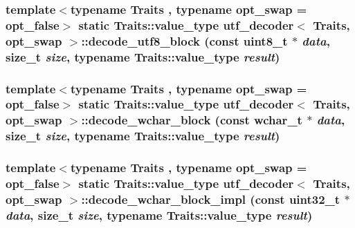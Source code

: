 \label{structutf__decoder_a8bed41cc707328e8d8ab91fd7c3c943e}
\hypertarget{structutf__decoder_a671829bbdba1eac5c8bd2bf781eae498}{
\subsubsection[{decode\_\-utf8\_\-block}]{\setlength{\rightskip}{0pt plus 5cm}template$<$typename Traits , typename opt\_\-swap  = opt\_\-false$>$ static Traits::value\_\-type {\bf utf\_\-decoder}$<$ Traits, opt\_\-swap $>$::decode\_\-utf8\_\-block (const uint8\_\-t $\ast$ {\em data}, \/  size\_\-t {\em size}, \/  typename Traits::value\_\-type {\em result})}}
\label{structutf__decoder_a671829bbdba1eac5c8bd2bf781eae498}
\hypertarget{structutf__decoder_a5953fd0661c64408e08161342e4c538d}{
\subsubsection[{decode\_\-wchar\_\-block}]{\setlength{\rightskip}{0pt plus 5cm}template$<$typename Traits , typename opt\_\-swap  = opt\_\-false$>$ static Traits::value\_\-type {\bf utf\_\-decoder}$<$ Traits, opt\_\-swap $>$::decode\_\-wchar\_\-block (const wchar\_\-t $\ast$ {\em data}, \/  size\_\-t {\em size}, \/  typename Traits::value\_\-type {\em result})}}
\label{structutf__decoder_a5953fd0661c64408e08161342e4c538d}
\hypertarget{structutf__decoder_a3bd423d3ce99b245c76be8a0796d951b}{
\subsubsection[{decode\_\-wchar\_\-block\_\-impl}]{\setlength{\rightskip}{0pt plus 5cm}template$<$typename Traits , typename opt\_\-swap  = opt\_\-false$>$ static Traits::value\_\-type {\bf utf\_\-decoder}$<$ Traits, opt\_\-swap $>$::decode\_\-wchar\_\-block\_\-impl (const uint32\_\-t $\ast$ {\em data}, \/  size\_\-t {\em size}, \/  typename Traits::value\_\-type {\em result})}}
